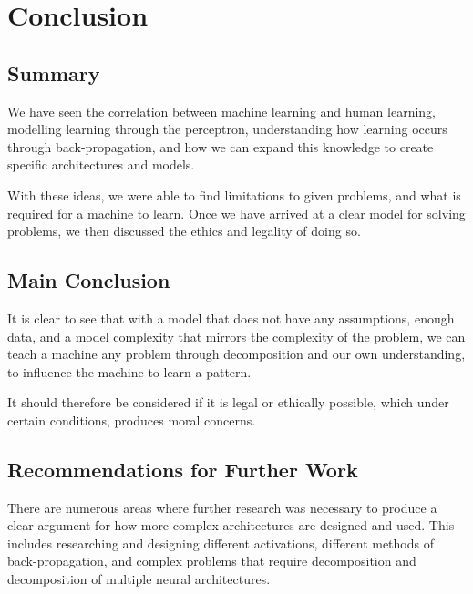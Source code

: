 \section{Conclusion}
\label{conc}

\subsection{Summary}

We have seen the correlation between machine learning and human learning, \gls{model}ling learning through the \gls{perceptron}, understanding how learning occurs through back-propagation, and how we can expand this knowledge to create specific architectures and \gls{model}s.

With these ideas, we were able to find limitations to given problems, and what is required for a machine to learn. Once we have arrived at a clear \gls{model} for solving problems, we then discussed the ethics and legality of doing so.

\subsection{Main Conclusion}

It is clear to see that with a \gls{model} that does not have any assumptions, enough data, and a \gls{model} complexity that mirrors the complexity of the problem, we can teach a machine any problem through \gls{decomposition} and our own understanding, to influence the machine to learn a pattern.

It should therefore be considered if it is legal or ethically possible, which under certain conditions, produces moral concerns.

\subsection{Recommendations for Further Work}

There are numerous areas where further research was necessary to produce a clear argument for how more complex architectures are designed and used. This includes researching and designing different activations, different methods of back-propagation, and complex problems that require decomposition and \gls{decomposition} of multiple neural architectures.

